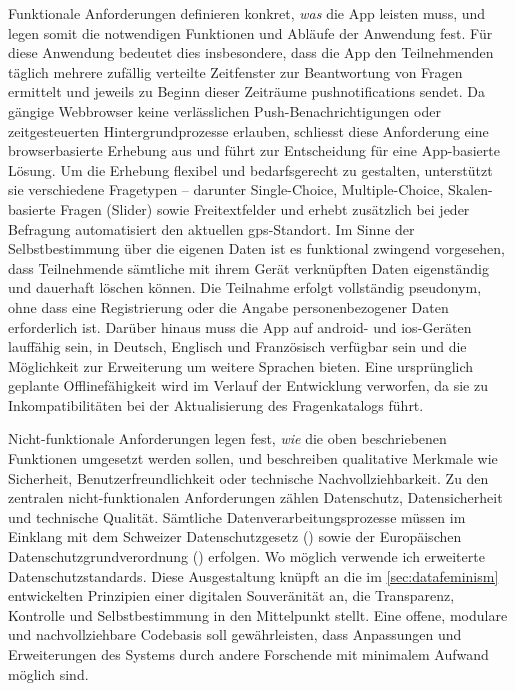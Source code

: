 Funktionale Anforderungen definieren konkret, \textit{was} die App leisten muss, und legen somit die notwendigen Funktionen und Abläufe der Anwendung fest. Für diese Anwendung bedeutet dies insbesondere, dass die App den Teilnehmenden täglich mehrere zufällig verteilte Zeitfenster zur Beantwortung von Fragen ermittelt und jeweils zu Beginn dieser Zeiträume \glspl{pushnotification} sendet. Da gängige Webbrowser keine verlässlichen Push-Benachrichtigungen oder zeitgesteuerten Hintergrundprozesse erlauben, schliesst diese Anforderung eine browserbasierte Erhebung aus und führt zur Entscheidung für eine App-basierte Lösung. Um die Erhebung flexibel und bedarfsgerecht zu gestalten, unterstützt sie verschiedene Fragetypen -- darunter Single-Choice, Multiple-Choice, Skalen-basierte Fragen (Slider) sowie Freitextfelder und erhebt zusätzlich bei jeder Befragung automatisiert den aktuellen \gls{gps}-Standort. Im Sinne der Selbstbestimmung über die eigenen Daten ist es funktional zwingend vorgesehen, dass Teilnehmende sämtliche mit ihrem Gerät verknüpften Daten eigenständig und dauerhaft löschen können. Die Teilnahme erfolgt vollständig pseudonym, ohne dass eine Registrierung oder die Angabe personenbezogener Daten erforderlich ist. Darüber hinaus muss die App auf \gls{android}- und \gls{ios}-Geräten lauffähig sein, in Deutsch, Englisch und Französisch verfügbar sein und die Möglichkeit zur Erweiterung um weitere Sprachen bieten. Eine ursprünglich geplante Offlinefähigkeit wird im Verlauf der Entwicklung verworfen, da sie zu Inkompatibilitäten bei der Aktualisierung des Fragenkatalogs führt.

Nicht-funktionale Anforderungen legen fest, \textit{wie} die oben beschriebenen Funktionen umgesetzt werden sollen, und beschreiben qualitative Merkmale wie Sicherheit, Benutzerfreundlichkeit oder technische Nachvollziehbarkeit. Zu den zentralen nicht-funktionalen Anforderungen zählen Datenschutz, Datensicherheit und technische Qualität. Sämtliche Datenverarbeitungsprozesse müssen im Einklang mit dem Schweizer Datenschutzgesetz () sowie der Europäischen Datenschutzgrundverordnung () erfolgen. Wo möglich verwende ich erweiterte Datenschutzstandards. Diese Ausgestaltung knüpft an die im \cref{sec:datafeminism} entwickelten Prinzipien einer digitalen Souveränität an, die Transparenz, Kontrolle und Selbstbestimmung in den Mittelpunkt stellt. Eine offene, modulare und nachvollziehbare Codebasis soll gewährleisten, dass Anpassungen und Erweiterungen des Systems durch andere Forschende mit minimalem Aufwand möglich sind.

